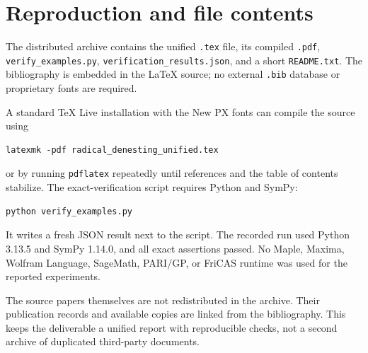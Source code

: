 \documentclass[11pt,a4paper]{article}
\theoremstyle{definition}
\theoremstyle{remark}
\numberwithin{equation}{section}
\begin{document}
\clearpage
\section{Reproduction and file contents}
\label{app:reproduce}

The distributed archive contains the unified \texttt{.tex} file, its compiled \texttt{.pdf}, \texttt{verify\_examples.py}, \texttt{verification\_results.json}, and a short \texttt{README.txt}. The bibliography is embedded in the \LaTeX{} source; no external \texttt{.bib} database or proprietary fonts are required.

A standard TeX Live installation with the New PX fonts can compile the source using
\begin{lstlisting}
latexmk -pdf radical_denesting_unified.tex
\end{lstlisting}
or by running \texttt{pdflatex} repeatedly until references and the table of contents stabilize. The exact-verification script requires Python and SymPy:
\begin{lstlisting}
python verify_examples.py
\end{lstlisting}
It writes a fresh JSON result next to the script. The recorded run used Python 3.13.5 and SymPy 1.14.0, and all exact assertions passed. No Maple, Maxima, Wolfram Language, SageMath, PARI/GP, or FriCAS runtime was used for the reported experiments.

The source papers themselves are not redistributed in the archive. Their publication records and available copies are linked from the bibliography. This keeps the deliverable a unified report with reproducible checks, not a second archive of duplicated third-party documents.
\end{document}
